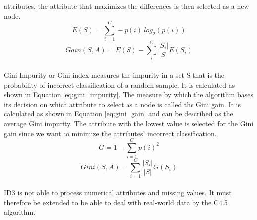attributes, the attribute that maximizes the differences is then selected as a 
new node. 
\begin{equation}
 E(S) = \sum_{i=1}^C -p(i) \ log_2(p(i))
 \label{eq:entropy}
\end{equation}
\begin{equation}
 Gain(S, A) = E(S) - \sum_{i}^{C} \frac{|S_i|}{S} E(S_i)
 \label{eq:gain}
\end{equation}
\\
Gini Impurity or Gini index measures the impurity in a set S that is the 
probability of incorrect classification of a random sample. It is calculated 
as shown in Equation \ref{eq:gini_impurity}. The measure by which the algorithm 
bases its decision on which attribute to select as a node is called the Gini 
gain. It is calculated as shown in Equation \ref{eq:gini_gain} and can be 
described as the average Gini impurity. The attribute with the lowest value is 
selected for the Gini gain since we want to minimize the attributes' incorrect 
classification.
\begin{equation}
 G = 1 - \sum_{i=1}^C p(i)^2
 \label{eq:gini_impurity}
\end{equation}
\begin{equation}
 Gini(S, A) = \sum_{i=1}^C \frac{|S_i|}{|S|} G(S_i)
 \label{eq:gini_gain}
\end{equation}
\\
ID3 is not able to process numerical attributes and missing values. It must 
therefore be extended to be able to deal with real-world data by the C4.5 
algorithm.
